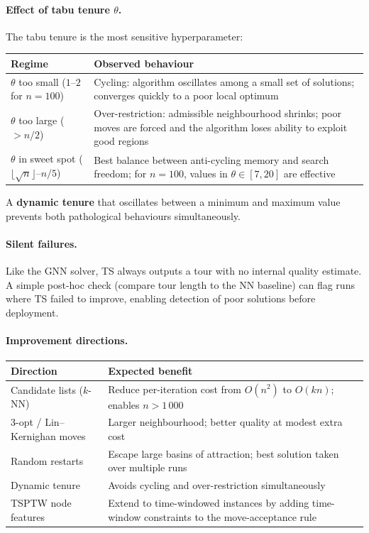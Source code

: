\documentclass[12pt,a4paper]{article}
\begin{document}
\paragraph{Effect of tabu tenure $\theta$.}
The tabu tenure is the most sensitive hyperparameter:

\begin{center}
\begin{tabularx}{\linewidth}{lX}
\toprule
\textbf{Regime} & \textbf{Observed behaviour} \\
\midrule
$\theta$ too small ($1$--$2$ for $n=100$) &
  Cycling: algorithm oscillates among a small set of solutions; converges
  quickly to a poor local optimum \\
$\theta$ too large ($> n/2$) &
  Over-restriction: admissible neighbourhood shrinks; poor moves are forced
  and the algorithm loses ability to exploit good regions \\
$\theta$ in sweet spot ($\lfloor\sqrt{n}\rfloor$--$n/5$) &
  Best balance between anti-cycling memory and search freedom;
  for $n=100$, values in $\theta \in [7, 20]$ are effective \\
\bottomrule
\end{tabularx}
\end{center}

A \textbf{dynamic tenure} that oscillates between a minimum and maximum value
prevents both pathological behaviours simultaneously.

\paragraph{Silent failures.}
Like the GNN solver, TS always outputs a tour with no internal quality
estimate.
A simple post-hoc check (compare tour length to the NN baseline) can flag
runs where TS failed to improve, enabling detection of poor solutions before
deployment.

\paragraph{Improvement directions.}

\begin{center}
\begin{tabularx}{\linewidth}{lX}
\toprule
\textbf{Direction} & \textbf{Expected benefit} \\
\midrule
Candidate lists ($k$-NN) & Reduce per-iteration cost from $O(n^2)$ to
  $O(k n)$; enables $n > 1\,000$ \\
3-opt / Lin--Kernighan moves & Larger neighbourhood; better quality
  at modest extra cost \\
Random restarts & Escape large basins of attraction;
  best solution taken over multiple runs \\
Dynamic tenure & Avoids cycling and over-restriction simultaneously \\
TSPTW node features & Extend to time-windowed instances by adding
  time-window constraints to the move-acceptance rule \\
\bottomrule
\end{tabularx}
\end{center}
\end{document}
